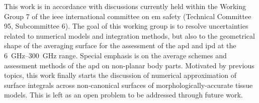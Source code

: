 This work is in accordance with discussions currently held within the Working Group 7 of the \gls{ieee} international committee on \gls{em} safety (Technical Committee 95, Subcommittee 6).
The goal of this working group is to resolve uncertainties related to numerical models and integration methods, but also to the geometrical shape of the averaging surface for the assessment of the \gls{apd} and \gls{ipd} at the \SIrange[range-units=single,range-phrase=--]{6}{300}{\GHz} range.
Special emphasis is on the average schemes and assessment methods of the \gls{apd} on non-planar body parts.
Motivated by previous topics, this work finally starts the discussion of numerical approximation of surface integrals across non-canonical surfaces of morphologically-accurate tissue models.
This is left as an open problem to be addressed through future work.
